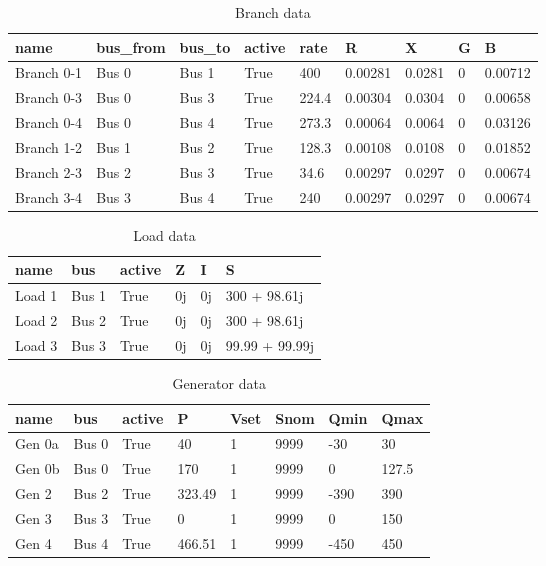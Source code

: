 \documentclass[nols,a4paper,twoside,notoc,fleqn]{tufte-book}
\begin{document}
\begin{table}[h!]
	\color{gray}
	\begin{tabular}{|l|l|l|l|l|l|l|l|l|}
		\hline
		name       & bus\_from & bus\_to & active    & rate  & R       & X      & G & B       \\ \hline
		Branch 0-1 & Bus 0     & Bus 1   & True & 400   & 0.00281 & 0.0281 & 0 & 0.00712 \\ \hline
		Branch 0-3 & Bus 0     & Bus 3   & True & 224.4 & 0.00304 & 0.0304 & 0 & 0.00658 \\ \hline
		Branch 0-4 & Bus 0     & Bus 4   & True & 273.3 & 0.00064 & 0.0064 & 0 & 0.03126 \\ \hline
		Branch 1-2 & Bus 1     & Bus 2   & True & 128.3 & 0.00108 & 0.0108 & 0 & 0.01852 \\ \hline
		Branch 2-3 & Bus 2     & Bus 3   & True & 34.6  & 0.00297 & 0.0297 & 0 & 0.00674 \\ \hline
		Branch 3-4 & Bus 3     & Bus 4   & True & 240   & 0.00297 & 0.0297 & 0 & 0.00674 \\ \hline
	\end{tabular}
\caption{Branch data}
\label{tbl:IEEE5:branch_data}
\end{table}


\begin{table}[h!]
	\color{gray}
	\begin{tabular}{|l|l|l|l|l|l|}
		\hline
		name & bus   & active    & Z  & I  & S         \\ \hline
		Load 1 & Bus 1 & True & 0j & 0j & 300 + 98.61j   \\ \hline
		Load 2 & Bus 2 & True & 0j & 0j & 300 + 98.61j   \\ \hline
		Load 3 & Bus 3 & True & 0j & 0j & 99.99 + 99.99j \\ \hline
	\end{tabular}
\caption{Load data}
\label{tbl:IEEE5:load_data}
\end{table}


\begin{table}[h!]
	\color{gray}
	\begin{tabular}{|l|l|l|l|l|l|l|l|}
		\hline
		name       & bus   & active    & P      & Vset & Snom & Qmin & Qmax  \\ \hline
		Gen 0a & Bus 0 & True & 40     & 1    & 9999 & -30  & 30    \\ \hline
		Gen 0b & Bus 0 & True & 170    & 1    & 9999 & 0    & 127.5 \\ \hline
		Gen 2 & Bus 2 & True & 323.49 & 1    & 9999 & -390 & 390   \\ \hline
		Gen 3 & Bus 3 & True & 0      & 1    & 9999 & 0    & 150   \\ \hline
		Gen 4 & Bus 4 & True & 466.51 & 1    & 9999 & -450 & 450   \\ \hline
	\end{tabular}
\caption{Generator data}
\label{tbl:IEEE5:gen_data}
\end{table}
\end{document}
